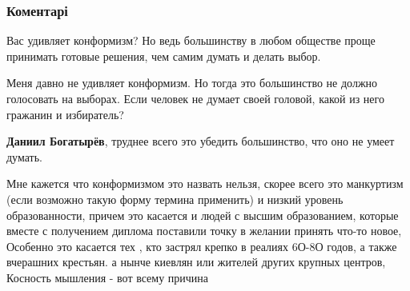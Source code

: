  
 
 
 
 
\subsubsection{Коментарі}
\label{sec:24_08_2021.fb.bogatyrev_daniil.1.konformizm_nezavisimost.cmt}

\begin{itemize}
 

Вас удивляет конформизм? Но ведь большинству в любом обществе проще принимать
готовые решения, чем самим думать и делать выбор.

\begin{itemize}
 

Меня давно не удивляет конформизм. Но тогда это большинство не должно
голосовать на выборах. Если человек не думает своей головой, какой из него
гражанин и избиратель?


 
\textbf{Даниил Богатырёв}, труднее всего это убедить большинство, что оно не умеет думать.

 

Мне кажется что конформизмом это назвать нельзя, скорее всего это манкуртизм
(если возможно такую форму термина применить) и низкий уровень образованности,
причем это касается и людей с высшим образованием, которые вместе с получением
диплома поставили точку в желании принять что-то новое, Особенно это касается
тех , кто застрял крепко в реалиях 6О-8О годов, а также вчерашних крестьян. а
нынче киевлян или жителей других крупных центров, Косность мышления - вот всему
причина



\end{itemize}
\end{itemize}
